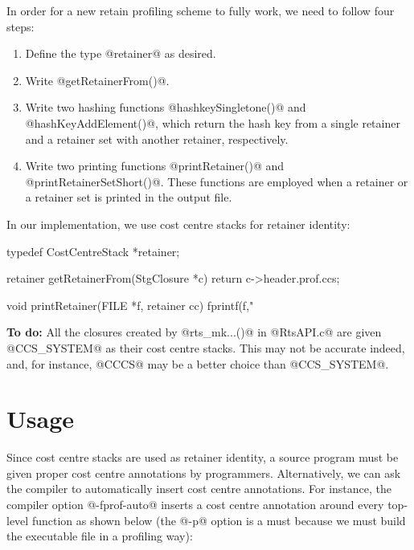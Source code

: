 \documentclass{article}
\begin{document}
In order for a new retain profiling scheme to fully work, we need to follow
four steps:

\begin{enumerate}
\item Define the type @retainer@ as desired.
\item Write @getRetainerFrom()@.
\item Write two hashing functions @hashkeySingletone()@ and 
      @hashKeyAddElement()@, which return the hash key from a single
      retainer and a retainer set with another retainer, respectively.
\item Write two printing functions @printRetainer()@ and 
      @printRetainerSetShort()@.
      These functions are employed when a retainer or a retainer set is
      printed in the output file. 
\end{enumerate}

In our implementation, we use cost centre stacks for retainer identity:

\begin{code}
typedef CostCentreStack *retainer;
\end{code}
\begin{code}
retainer getRetainerFrom(StgClosure *c) { return c->header.prof.ccs; }
\end{code}
\begin{code}
void printRetainer(FILE *f, retainer cc)
{
  fprintf(f,"%
}
\end{code}

\textbf{To do:} All the closures created by @rts_mk...()@ in @RtsAPI.c@ are given 
@CCS_SYSTEM@ as their cost centre stacks. This may not be accurate indeed,
and, for instance, @CCCS@ may be a better choice than @CCS_SYSTEM@. 

\section{Usage}

Since cost centre stacks are used as retainer identity, a source program
must be given proper cost centre annotations by programmers. 
Alternatively,
we can ask the compiler to automatically insert cost centre annotations.
For instance, the compiler option @-fprof-auto@ inserts a cost centre
annotation around every top-level function as shown below 
(the @-p@ option is a must
because we must build the executable file in a profiling way):

\end{document}

